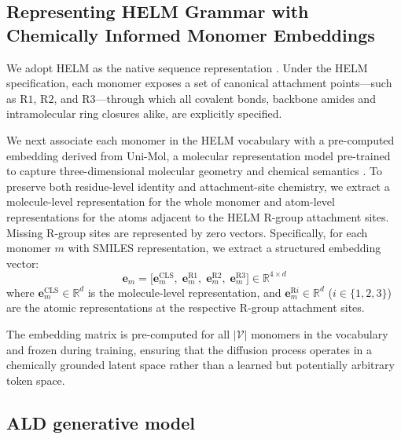 \begin{methods}
\subsection{Representing HELM Grammar with Chemically Informed Monomer Embeddings}\label{subsec:helm}

We adopt HELM as the native sequence representation \citep{ref_helm}. Under the HELM specification, each monomer exposes a set of canonical attachment points---such as $\mathrm{R1}$, $\mathrm{R2}$, and $\mathrm{R3}$---through which all covalent bonds, backbone amides and intramolecular ring closures alike, are explicitly specified.

We next associate each monomer in the HELM vocabulary with a pre-computed embedding derived from Uni-Mol, a molecular representation model pre-trained to capture three-dimensional molecular geometry and chemical semantics \citep{ref_unimol}. To preserve both residue-level identity and attachment-site chemistry, we extract a molecule-level representation for the whole monomer and atom-level representations for the atoms adjacent to the HELM R-group attachment sites. Missing R-group sites are represented by zero vectors.
Specifically, for each monomer $m$ with SMILES representation, we extract a structured embedding vector:
\begin{equation}
\mathbf{e}_m = \bigl[\mathbf{e}_m^{\mathrm{CLS}},\; \mathbf{e}_m^{\mathrm{R1}},\; \mathbf{e}_m^{\mathrm{R2}},\; \mathbf{e}_m^{\mathrm{R3}}\bigr] \in \mathbb{R}^{4 \times d}
\label{eq:unimol_full}
\end{equation}
where $\mathbf{e}_m^{\mathrm{CLS}} \in \mathbb{R}^d$ is the molecule-level representation, and $\mathbf{e}_m^{\mathrm{R}i} \in \mathbb{R}^d$ ($i \in \{1,2,3\}$) are the atomic representations at the respective R-group attachment sites.

The embedding matrix is pre-computed for all $|\mathcal{V}|$ monomers in the vocabulary and frozen during training, ensuring that the diffusion process operates in a chemically grounded latent space rather than a learned but potentially arbitrary token space.


\subsection{ALD generative model}\label{subsec:ald_generative_model}


\end{methods}
